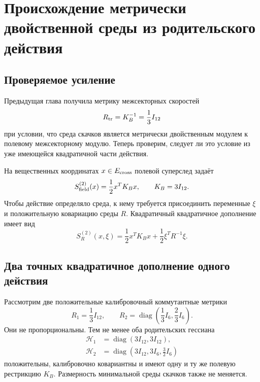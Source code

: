 \chapter{Происхождение метрически двойственной среды из родительского действия}
\label{ch:v8-metric-dual-environment-parent-action-origin-gate}

\section{Проверяемое усиление}

Предыдущая глава получила метрику межсекторных скоростей
\begin{equation}
 R_{\rm tr}=K_B^{-1}=\frac13I_{12}
 \label{eq:v8-riesz-cross-rate}
\end{equation}
при условии, что среда скачков является метрически двойственным модулем к
полевому межсекторному модулю. Теперь проверим, следует ли это условие из уже
имеющейся квадратичной части действия.

На вещественных координатах $x\in E_{\rm cross}$ полевой суперслед задаёт
\begin{equation}
 S_{\rm field}^{(2)}(x)=\frac12x^TK_Bx,
 \qquad K_B=3I_{12}.
 \label{eq:v8-cross-field-parent-restriction}
\end{equation}
Чтобы действие определяло среда, к нему требуется присоединить переменные
$\xi$ и положительную ковариацию среды $R$. Квадратичный квадратичное дополнение имеет вид
\begin{equation}
 S_R^{(2)}(x,\xi)
 =\frac12x^TK_Bx+\frac12\xi^TR^{-1}\xi.
 \label{eq:v8-cross-field-bath-parent-completion}
\end{equation}

\section{Два точных квадратичное дополнение одного действия}

Рассмотрим две положительные калибровочный коммутантные метрики
\begin{equation}
 R_1=\frac13I_{12},
 \qquad
 R_2=\operatorname{diag}\left(
 \frac13I_6,\frac23I_6\right).
 \label{eq:v8-two-bath-rate-completions}
\end{equation}
Они не пропорциональны. Тем не менее оба родительских гессиана
\begin{align}
 \mathcal H_1&=\operatorname{diag}(3I_{12},3I_{12}),\\
 \mathcal H_2&=\operatorname{diag}
 \left(3I_{12},3I_6,\frac32I_6\right)
 \label{eq:v8-two-parent-hessians}
\end{align}
положительны, калибровочно ковариантны и имеют одну и ту же полевую рестрикцию
$K_B$. Размерность минимальной среды скачков также не меняется.

